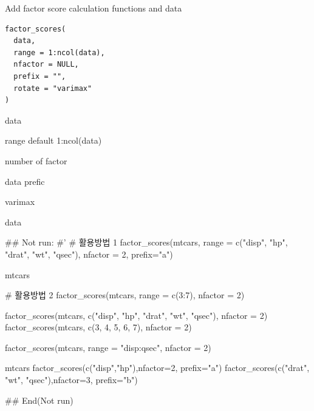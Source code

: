 \documentclass[a4paper]{book}
\begin{document}
%
\begin{Description}
Add factor score calculation functions and data
\end{Description}
%
\begin{Usage}
\begin{verbatim}
factor_scores(
  data,
  range = 1:ncol(data),
  nfactor = NULL,
  prefix = "",
  rotate = "varimax"
)
\end{verbatim}
\end{Usage}
%
\begin{Arguments}
\begin{ldescription}
\item[\code{data}] data

\item[\code{range}] range default 1:ncol(data)

\item[\code{nfactor}] number of factor

\item[\code{prefix}] data prefic

\item[\code{rotate}] varimax
\end{ldescription}
\end{Arguments}
%
\begin{Value}
data
\end{Value}
%
\begin{Examples}
\begin{ExampleCode}


\#\# Not run: 
#'
# 활용방법 1
factor_scores(mtcars,
              range = c("disp", "hp", "drat", "wt", "qsec"),
              nfactor = 2, prefix="a")

mtcars %

# 활용방법 2
factor_scores(mtcars, range = c(3:7), nfactor = 2)

factor_scores(mtcars, c("disp", "hp", "drat", "wt", "qsec"), nfactor = 2)
factor_scores(mtcars, c(3, 4, 5, 6, 7), nfactor = 2)

factor_scores(mtcars, range = "disp:qsec", nfactor = 2)


mtcars %
  factor_scores(c("disp","hp"),nfactor=2, prefix="a") %
  factor_scores(c("drat", "wt", "qsec"),nfactor=3, prefix="b") %


## End(Not run)
\end{ExampleCode}
\end{Examples}
\end{document}
